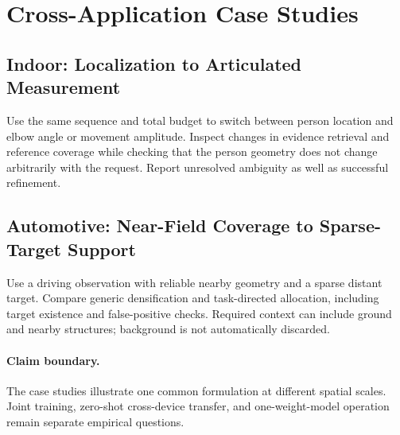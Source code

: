 \section{Cross-Application Case Studies}
\label{sec:cases}
\subsection{Indoor: Localization to Articulated Measurement}
Use the same sequence and total budget to switch between person location and elbow angle or movement amplitude. Inspect changes in evidence retrieval and reference coverage while checking that the person geometry does not change arbitrarily with the request. Report unresolved ambiguity as well as successful refinement.

\subsection{Automotive: Near-Field Coverage to Sparse-Target Support}
Use a driving observation with reliable nearby geometry and a sparse distant target. Compare generic densification and task-directed allocation, including target existence and false-positive checks. Required context can include ground and nearby structures; background is not automatically discarded.

\paragraph{Claim boundary.}
The case studies illustrate one common formulation at different spatial scales. Joint training, zero-shot cross-device transfer, and one-weight-model operation remain separate empirical questions.

